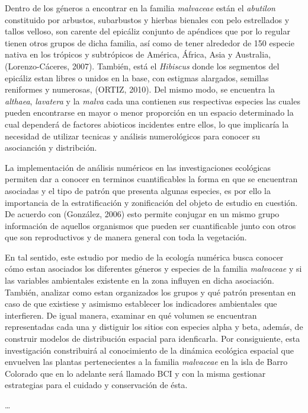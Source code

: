 \documentclass[11pt,]{article}
\begin{document}
Dentro de los géneros a encontrar en la familia \emph{malvaceae} están
el \emph{abutilon} constituido por arbustos, subarbustos y hierbas
bienales con pelo estrellados y tallos velloso, son carente del epicáliz
conjunto de apéndices que por lo regular tienen otros grupos de dicha
familia, así como de tener alrededor de 150 especie nativa en los
trópicos y subtrópicos de América, África, Asia y Australia,
(Lorenzo-Cáceres, 2007). También, está el \emph{Hibiscus} donde los
segmentos del epicáliz estan libres o unidos en la base, con estigmas
alargados, semillas reniformes y numerosas, (ORTIZ, 2010). Del mismo
modo, se encuentra la \emph{althaea}, \emph{lavatera} y la \emph{malva}
cada una contienen sus respectivas especies las cuales pueden
encontrarse en mayor o menor proporción en un espacio determinado la
cual dependerá de factores abioticos incidentes entre ellos, lo que
implicaría la necesidad de utilizar tecnicas y análisis numerológicos
para conocer su asocianción y distribción.

La implementación de análisis numéricos en las investigaciones
ecológicas permiten dar a conocer en terminos cuantificables la forma en
que se encuentran asociadas y el tipo de patrón que presenta algunas
especies, es por ello la importancia de la estratificación y
zonificación del objeto de estudio en cuestión. De acuerdo con
(González, 2006) esto permite conjugar en un mismo grupo información de
aquellos organismos que pueden ser cuantificable junto con otros que son
reproductivos y de manera general con toda la vegetación.

En tal sentido, este estudio por medio de la ecología numérica busca
conocer cómo estan asociados los diferentes géneros y especies de la
familia \emph{malvaceae} y si las variables ambientales existente en la
zona influyen en dicha asociación. También, analizar como estan
organizados los grupos y qué patrón presentan en caso de que existiese y
asimismo establecer los indicadores ambientales que interfieren. De
igual manera, examinar en qué volumen se encuentran representadas cada
una y distiguir los sitios con especies alpha y beta, además, de
construir modelos de distribución espacial para idenficarla. Por
consiguiente, esta investigación constribuirá al conocimiento de la
dinámica ecológica espacial que envuelven las plantas pertenecientes a
la familia \emph{malvaceae} en la isla de Barro Colorado que en lo
adelante será llamado BCI y con la misma gestionar estrategias para el
cuidado y conservación de ésta.

\ldots
\end{document}
